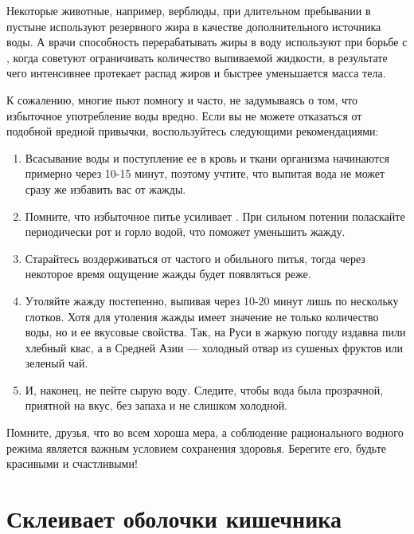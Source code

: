 Некоторые животные, например, верблюды, при длительном пребывании в пустыне используют  резервного жира в качестве дополнительного источника воды. А врачи способность перерабатывать жиры в воду используют при борьбе с , когда советуют ограничивать количество выпиваемой жидкости, в результате чего интенсивнее протекает распад жиров и быстрее уменьшается масса тела.

К сожалению, многие пьют помногу и часто, не задумываясь о том, что избыточное употребление воды вредно. Если вы не можете отказаться от подобной вредной привычки, воспользуйтесь следующими рекомендациями:

\begin{enumerate}
    \item Всасывание воды и поступление ее в кровь и ткани организма начинаются примерно через 10-15 минут, поэтому учтите, что выпитая вода не может сразу же избавить вас от жажды.

    \item Помните, что избыточное питье усиливает . При сильном потении поласкайте периодически рот и горло водой, что поможет уменьшить жажду.

    \item Старайтесь воздерживаться от частого и обильного питья, тогда через некоторое время ощущение жажды будет появляться реже.

    \item Утоляйте жажду постепенно, выпивая через 10-20 минут лишь по нескольку глотков. Хотя для утоления жажды имеет значение не только количество воды, но и ее вкусовые свойства. Так, на Руси в жаркую погоду издавна пили хлебный квас, а в Средней Азии --- холодный отвар из сушеных фруктов или зеленый чай.

    \item И, наконец, не пейте сырую воду. Следите, чтобы вода была прозрачной, приятной на вкус, без запаха и не слишком холодной.
\end{enumerate}

Помните, друзья, что во всем хороша мера, а соблюдение рационального водного режима является важным условием сохранения здоровья. Берегите его, будьте красивыми и счастливыми!




\newpage
\section{Склеивает оболочки кишечника}

